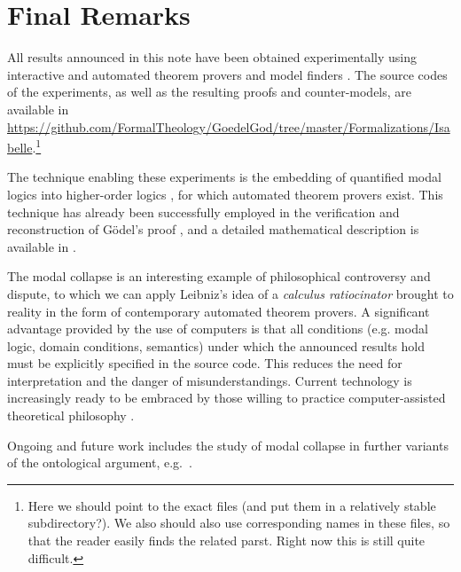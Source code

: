 \documentclass{birkjour}
\theoremstyle{definition}
\theoremstyle{remark}
\numberwithin{equation}{section}
\begin{document}
\section{Final Remarks}

All results announced in this note have been obtained experimentally
using interactive and automated theorem provers and model finders
\cite{LEO,Satallax,Isabelle,Coq,Nitpick}.  The source codes of the
experiments, as well as the resulting proofs and counter-models, are
available in
\url{https://github.com/FormalTheology/GoedelGod/tree/master/Formalizations/Isabelle}.\footnote{Here
  we should point to the exact files (and put them in a relatively
  stable subdirectory?). We also should also use corresponding names in
  these files, so that the reader easily finds the related 
  parst. Right now this is still quite difficult.}

The technique enabling these experiments is the embedding of 
quantified modal logics into higher-order logics 
\cite{J23,B9,C36}, for which automated theorem provers exist. 
This technique has already been successfully employed in the 
verification and reconstruction of G\"odel's proof 
\cite{J28,J30,W50,J29}, and a detailed 
mathematical description is available in \cite{C40}.

The modal collapse is an interesting example of philosophical 
controversy and dispute, to which we can apply Leibniz's idea 
of a \emph{calculus ratiocinator} brought to reality in the 
form of contemporary automated theorem provers. 
A significant advantage provided by the use of computers is 
that all conditions (e.g. modal logic, domain conditions, 
semantics) under which the announced results hold must be 
explicitly specified in the source code. This reduces the need 
for interpretation and the danger of misunderstandings. 
Current technology is increasingly ready to be embraced by 
those willing to practice computer-assisted theoretical 
philosophy \cite{oppenheimera11,rushby13}.

Ongoing and future work includes the study of modal collapse in
further variants of the ontological argument, e.g.~\cite{bjordal99,fuhrmann05:_exist_notwen}.
 




\end{document}
